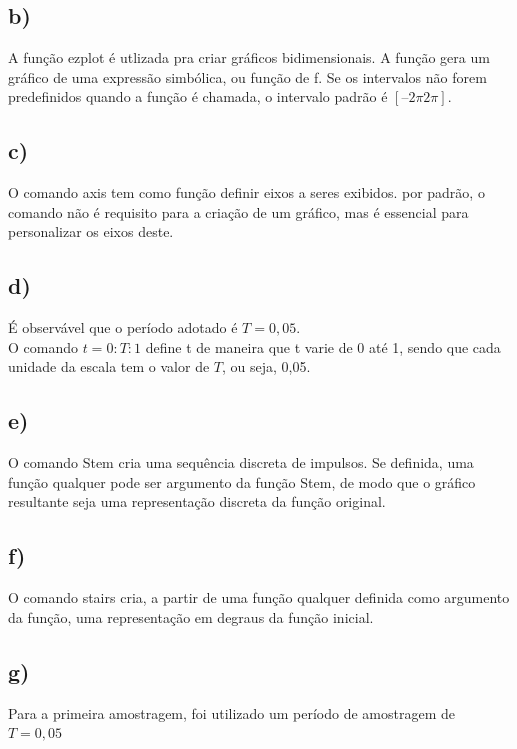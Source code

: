 \documentclass{article}[a4paper,12pt,twoside]
\begin{document}
\subsection{b)}

A função ezplot é utlizada pra criar gráficos bidimensionais. A função gera um gráfico de uma expressão simbólica, ou função de f. Se os intervalos não forem predefinidos quando a função é chamada, o intervalo padrão é $[–2\pi 2\pi]$.

\subsection{c)}

O comando axis tem como função definir eixos a seres exibidos. por padrão, o comando não é requisito para a criação de um gráfico, mas é essencial para personalizar os eixos deste. 

\subsection{d)}

É observável que o período adotado é $T = 0,05$.\\

O comando $t = 0:T:1$ define t de maneira que t varie de 0 até 1, sendo que cada unidade da escala tem o valor de $T$, ou seja, 0,05.

\subsection{e)}

O comando Stem cria uma sequência discreta de impulsos. Se definida, uma função qualquer pode ser argumento da função Stem, de modo que o gráfico resultante seja uma representação discreta da função original.

\subsection{f)}

O comando stairs cria, a partir de uma função qualquer definida como argumento da função, uma representação em degraus da função inicial.

\subsection{g)}

Para a primeira amostragem, foi utilizado um período de amostragem de $T = 0,05$
\end{document}
